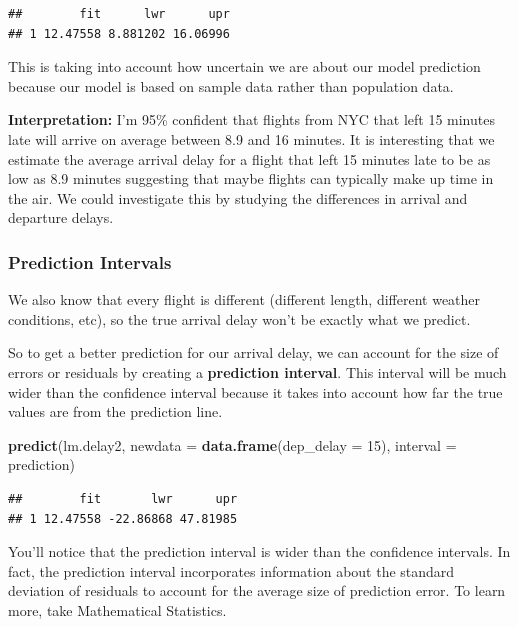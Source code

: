 \documentclass[
]{book}
\newenvironment{Shaded}{\begin{snugshade}}{\end{snugshade}}
\newcommand{\AttributeTok}[1]{\textcolor[rgb]{0.13,0.29,0.53}{#1}}
\newcommand{\DecValTok}[1]{\textcolor[rgb]{0.00,0.00,0.81}{#1}}
\newcommand{\FunctionTok}[1]{\textcolor[rgb]{0.13,0.29,0.53}{\textbf{#1}}}
\newcommand{\NormalTok}[1]{#1}
\newcommand{\StringTok}[1]{\textcolor[rgb]{0.31,0.60,0.02}{#1}}
\begin{document}
\begin{verbatim}
##        fit      lwr      upr
## 1 12.47558 8.881202 16.06996
\end{verbatim}

This is taking into account how uncertain we are about our model prediction because our model is based on sample data rather than population data.

\textbf{Interpretation:} I'm 95\% confident that flights from NYC that left 15 minutes late will arrive on average between 8.9 and 16 minutes. It is interesting that we estimate the average arrival delay for a flight that left 15 minutes late to be as low as 8.9 minutes suggesting that maybe flights can typically make up time in the air. We could investigate this by studying the differences in arrival and departure delays.

\subsubsection{Prediction Intervals}\label{prediction-intervals}

We also know that every flight is different (different length, different weather conditions, etc), so the true arrival delay won't be exactly what we predict.

So to get a better prediction for our arrival delay, we can account for the size of errors or residuals by creating a \textbf{prediction interval}. This interval will be much wider than the confidence interval because it takes into account how far the true values are from the prediction line.

\begin{Shaded}
\begin{Highlighting}[]
\FunctionTok{predict}\NormalTok{(lm.delay2, }\AttributeTok{newdata =} \FunctionTok{data.frame}\NormalTok{(}\AttributeTok{dep\_delay =} \DecValTok{15}\NormalTok{), }\AttributeTok{interval =} \StringTok{\textquotesingle{}prediction\textquotesingle{}}\NormalTok{)}
\end{Highlighting}
\end{Shaded}

\begin{verbatim}
##        fit       lwr      upr
## 1 12.47558 -22.86868 47.81985
\end{verbatim}

You'll notice that the prediction interval is wider than the confidence intervals. In fact, the prediction interval incorporates information about the standard deviation of residuals to account for the average size of prediction error. To learn more, take Mathematical Statistics.
\end{document}
